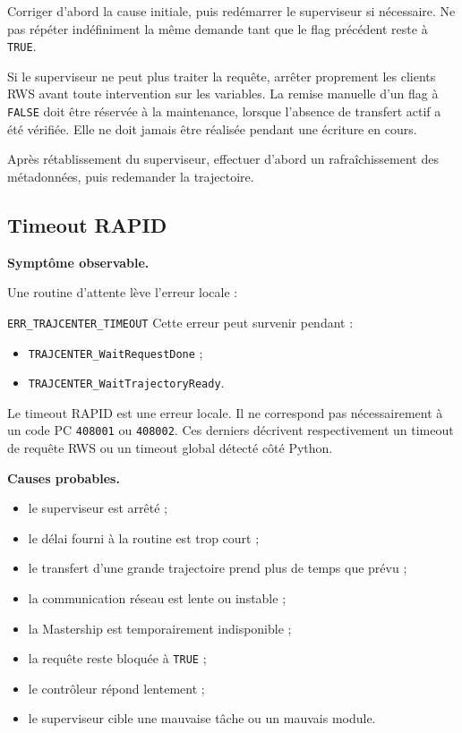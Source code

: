 \documentclass{rapportENSAM}
\begin{document}
Corriger d'abord la cause initiale, puis redémarrer le superviseur si
nécessaire. Ne pas répéter indéfiniment la même demande tant que le flag
précédent reste à \texttt{TRUE}.

Si le superviseur ne peut plus traiter la requête, arrêter proprement les
clients RWS avant toute intervention sur les variables. La remise manuelle
d'un flag à \texttt{FALSE} doit être réservée à la maintenance, lorsque
l'absence de transfert actif a été vérifiée. Elle ne doit jamais être réalisée
pendant une écriture en cours.

Après rétablissement du superviseur, effectuer d'abord un rafraîchissement des
métadonnées, puis redemander la trajectoire.


\subsection{Timeout RAPID}
\label{subsec:diagnostic-rapid-timeout}

\textbf{Symptôme observable.}

Une routine d'attente lève l'erreur locale :

\texttt{ERR\_TRAJCENTER\_TIMEOUT}
Cette erreur peut survenir pendant :

\begin{itemize}
    \item \texttt{TRAJCENTER\_WaitRequestDone} ;
    \item \texttt{TRAJCENTER\_WaitTrajectoryReady}.
\end{itemize}

Le timeout RAPID est une erreur locale. Il ne correspond pas nécessairement à
un code PC \texttt{408001} ou \texttt{408002}. Ces derniers décrivent
respectivement un timeout de requête RWS ou un timeout global détecté côté
Python.

\textbf{Causes probables.}

\begin{itemize}
\item le superviseur est arrêté ;
\item le délai fourni à la routine est trop court ;
\item le transfert d'une grande trajectoire prend plus de temps que prévu ;
\item la communication réseau est lente ou instable ;
\item la Mastership est temporairement indisponible ;
\item la requête reste bloquée à \texttt{TRUE} ;
\item le contrôleur répond lentement ;
\item le superviseur cible une mauvaise tâche ou un mauvais module.
\end{itemize}
\end{document}
